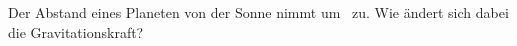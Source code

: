 Der Abstand eines Planeten von der Sonne nimmt um \zuO\ zu. Wie ändert sich dabei die Gravitationskraft?
